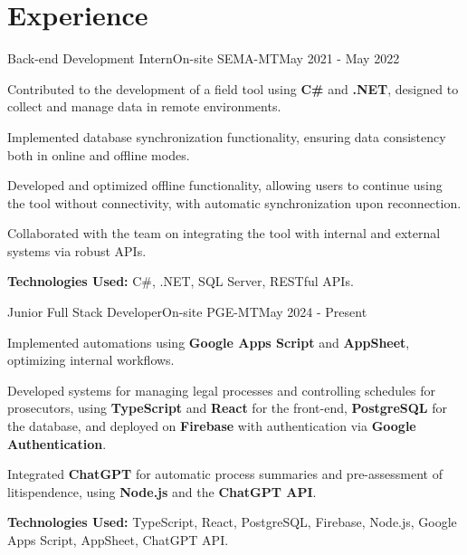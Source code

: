 \section{\textbf{Experience}}
  \resumeSubHeadingListStart
    \resumeSubheading
      { Back-end Development Intern}{On-site}
      {SEMA-MT}{May 2021 - May 2022}
      \vspace{-2.0mm}
      \resumeItemListStart
        \item {Contributed to the development of a field tool using \textbf{C\#} and \textbf{.NET}, designed to collect and manage data in remote environments.}
        \item {Implemented database synchronization functionality, ensuring data consistency both in online and offline modes.}
        \item {Developed and optimized offline functionality, allowing users to continue using the tool without connectivity, with automatic synchronization upon reconnection.}
        \item {Collaborated with the team on integrating the tool with internal and external systems via robust APIs.}
        \item {\textbf{Technologies Used:} C\#, .NET, SQL Server, RESTful APIs.}
      \resumeItemListEnd


    \vspace{-3.0mm}
    
        \resumeSubheading
      { Junior Full Stack Developer}{On-site}
      {PGE-MT}{May 2024 - Present}
      \vspace{-2.0mm}
      \resumeItemListStart
        \item {Implemented automations using \textbf{Google Apps Script} and \textbf{AppSheet}, optimizing internal workflows.}
        \item {Developed systems for managing legal processes and controlling schedules for prosecutors, using \textbf{TypeScript} and \textbf{React} for the front-end, \textbf{PostgreSQL} for the database, and deployed on \textbf{Firebase} with authentication via \textbf{Google Authentication}.}
        \item {Integrated \textbf{ChatGPT} for automatic process summaries and pre-assessment of litispendence, using \textbf{Node.js} and the \textbf{ChatGPT API}.}
        \item {\textbf{Technologies Used:} TypeScript, React, PostgreSQL, Firebase, Node.js, Google Apps Script, AppSheet, ChatGPT API.}
      \resumeItemListEnd

